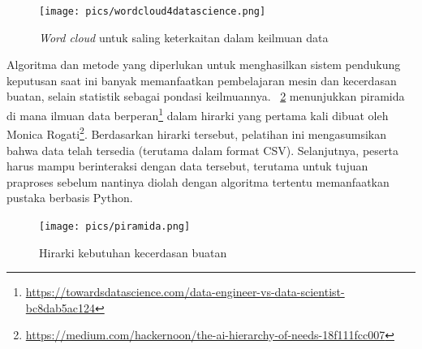 \begin{figure}
  \begin{center}
    \texttt{[image: pics/wordcloud4datascience.png]}
    \caption{\textit{Word cloud} untuk saling keterkaitan dalam keilmuan data \cite{braschler2019applied}}
    \label{fig:wordcloud}
  \end{center}
\end{figure}

Algoritma dan metode yang diperlukan untuk menghasilkan sistem pendukung keputusan saat ini banyak memanfaatkan pembelajaran mesin dan kecerdasan buatan, selain statistik sebagai pondasi keilmuannya. \figurename~\ref{fig:piramida} menunjukkan piramida di mana ilmuan data berperan\footnote{\url{https://towardsdatascience.com/data-engineer-vs-data-scientist-bc8dab5ac124}} dalam hirarki yang pertama kali dibuat oleh Monica Rogati\footnote{\url{https://medium.com/hackernoon/the-ai-hierarchy-of-needs-18f111fcc007}}. Berdasarkan hirarki tersebut, pelatihan ini mengasumsikan bahwa data telah tersedia (terutama dalam format CSV). Selanjutnya, peserta harus mampu berinteraksi dengan data tersebut, terutama untuk tujuan praproses sebelum nantinya diolah dengan algoritma tertentu memanfaatkan pustaka berbasis Python.

\begin{figure}
  \begin{center}
    \texttt{[image: pics/piramida.png]}
    \caption{Hirarki kebutuhan kecerdasan buatan}
    \label{fig:piramida}
  \end{center}
\end{figure}

